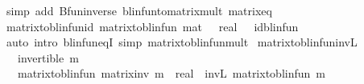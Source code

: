 \begin{isabellebody}
%
\isatagproof
{}\isamarkupfalse%
\ {\isacharparenleft}{\kern0pt}simp\ add{\isacharcolon}{\kern0pt}\ Bfun{\isacharunderscore}{\kern0pt}inverse\ blinfun{\isacharunderscore}{\kern0pt}to{\isacharunderscore}{\kern0pt}matrix{\isacharunderscore}{\kern0pt}mult{\isacharprime}{\kern0pt}{\isacharprime}{\kern0pt}\ matrix{\isacharunderscore}{\kern0pt}eq{\isacharparenright}{\kern0pt}%
\endisatagproof
{\isafoldproof}%
%
\isadelimproof
\isanewline
%
\endisadelimproof
\isanewline
{}\isamarkupfalse%
\ matrix{\isacharunderscore}{\kern0pt}to{\isacharunderscore}{\kern0pt}blinfun{\isacharunderscore}{\kern0pt}id{\isacharcolon}{\kern0pt}\ {\isachardoublequoteopen}matrix{\isacharunderscore}{\kern0pt}to{\isacharunderscore}{\kern0pt}blinfun\ {\isacharparenleft}{\kern0pt}mat\ {}\ {\isacharcolon}{\kern0pt}{\isacharcolon}{\kern0pt}\ {\isacharparenleft}{\kern0pt}real\ {\isacharcircum}{\kern0pt}{\isacharunderscore}{\kern0pt}{\isacharcircum}{\kern0pt}{\isacharunderscore}{\kern0pt}{\isacharparenright}{\kern0pt}{\isacharparenright}{\kern0pt}\ {\isacharequal}{\kern0pt}\ id{\isacharunderscore}{\kern0pt}blinfun{\isachardoublequoteclose}\isanewline
%
\isadelimproof
\ \ %
\endisadelimproof
%
\isatagproof
{}\isamarkupfalse%
\ {\isacharparenleft}{\kern0pt}auto\ intro{\isacharbang}{\kern0pt}{\isacharcolon}{\kern0pt}\ blinfun{\isacharunderscore}{\kern0pt}eqI\ simp{\isacharcolon}{\kern0pt}\ matrix{\isacharunderscore}{\kern0pt}to{\isacharunderscore}{\kern0pt}blinfun{\isacharunderscore}{\kern0pt}mult{\isacharparenright}{\kern0pt}%
\endisatagproof
{\isafoldproof}%
%
\isadelimproof
\isanewline
%
\endisadelimproof
\isanewline
{}\isamarkupfalse%
\ matrix{\isacharunderscore}{\kern0pt}to{\isacharunderscore}{\kern0pt}blinfun{\isacharunderscore}{\kern0pt}inv\isactrlsub L{\isacharcolon}{\kern0pt}\isanewline
\ \ \ {\isachardoublequoteopen}invertible\ m{\isachardoublequoteclose}\isanewline
\ \ \ {\isachardoublequoteopen}matrix{\isacharunderscore}{\kern0pt}to{\isacharunderscore}{\kern0pt}blinfun\ {\isacharparenleft}{\kern0pt}matrix{\isacharunderscore}{\kern0pt}inv\ {\isacharparenleft}{\kern0pt}m\ {\isacharcolon}{\kern0pt}{\isacharcolon}{\kern0pt}\ real{\isacharcircum}{\kern0pt}{\isacharunderscore}{\kern0pt}{\isacharcircum}{\kern0pt}{\isacharunderscore}{\kern0pt}{\isacharparenright}{\kern0pt}{\isacharparenright}{\kern0pt}\ {\isacharequal}{\kern0pt}\ inv\isactrlsub L\ {\isacharparenleft}{\kern0pt}matrix{\isacharunderscore}{\kern0pt}to{\isacharunderscore}{\kern0pt}blinfun\ m{\isacharparenright}{\kern0pt}{\isachardoublequoteclose}\isanewline

\end{isabellebody}
